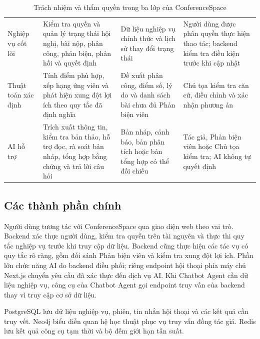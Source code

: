 \begin{table}[!htbp]
\centering
\caption{Trách nhiệm và thẩm quyền trong ba lớp của ConferenceSpace}
\label{tab:ch3-demo-responsibility}
\setlength{\tabcolsep}{3pt}
\renewcommand{\arraystretch}{1.15}
\begin{tabular}{|T{0.10\textwidth}|T{0.33\textwidth}|T{0.25\textwidth}|T{0.3\textwidth}|}
\hline
{} &  &  &  \\ \hline
Nghiệp vụ cốt lõi & Kiểm tra quyền và quản lý trạng thái hội nghị, bài nộp, phân công, phản biện, phản hồi và quyết định & Dữ liệu nghiệp vụ chính thức và lịch sử thay đổi trạng thái & Người dùng được phân quyền thực hiện thao tác; backend kiểm tra điều kiện trước khi cập nhật \\ \hline
Thuật toán xác định & Tính điểm phù hợp, xếp hạng ứng viên và phát hiện xung đột lợi ích theo quy tắc đã định nghĩa & Đề xuất phân công, điểm số, lý do và danh sách bài chưa đủ Phản biện viên & Chủ tọa kiểm tra căn cứ, điều chỉnh và xác nhận phương án \\ \hline
AI hỗ trợ & Trích xuất thông tin, kiểm tra bản thảo, hỗ trợ đọc, rà soát bản nháp, tổng hợp bằng chứng và trả lời câu hỏi & Bản nháp, cảnh báo, bản phân tích hoặc bản tổng hợp có thể đối chiếu & Tác giả, Phản biện viên hoặc Chủ tọa kiểm tra; AI không tự quyết định \\ \hline
\end{tabular}
\end{table}

\subsection{Các thành phần chính}

Người dùng tương tác với ConferenceSpace qua giao diện web theo vai trò. Backend xác thực người dùng, kiểm tra quyền trên tài nguyên và thực thi quy tắc nghiệp vụ trước khi truy cập dữ liệu. Backend cũng thực hiện các tác vụ có quy tắc rõ ràng, gồm đối sánh Phản biện viên và kiểm tra xung đột lợi ích. Phần lớn chức năng AI do backend điều phối; riêng endpoint hội thoại phía máy chủ Next.js chuyển yêu cầu đã xác thực đến dịch vụ AI. Khi Chatbot Agent cần dữ liệu nghiệp vụ, công cụ của Chatbot Agent gọi endpoint truy vấn của backend thay vì truy cập cơ sở dữ liệu.

PostgreSQL lưu dữ liệu nghiệp vụ, phiên, tin nhắn hội thoại và các kết quả cần truy vết. Neo4j biểu diễn quan hệ học thuật phục vụ truy vấn đồng tác giả. Redis lưu kết quả công cụ tạm thời và bộ đếm giới hạn tần suất.

